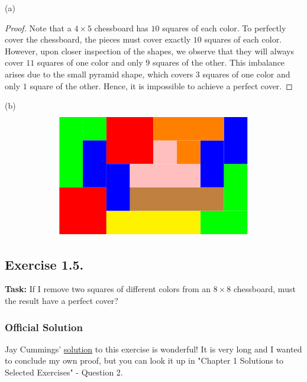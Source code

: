 \documentclass{article}
\begin{document}
(a) 
\begin{proof}
    Note that a $4 \times 5$ chessboard has $10$ squares of each color. To perfectly cover the chessboard, the pieces must cover exactly $10$ squares of each color. However, upon closer inspection of the shapes, we observe that they will always cover $11$ squares of one color and only $9$ squares of the other. This imbalance arises due to the small pyramid shape, which covers $3$ squares of one color and only $1$ square of the other. Hence, it is impossible to achieve a perfect cover.
    
\end{proof}

\noindent (b) 
\[
\begin{tikzpicture}

\fill[red] (0,0) rectangle (2,2);   
\fill[red] (2,3) rectangle (4,5);   

\fill[green] (0,2) rectangle (1,5);   
\fill[green] (1,4) rectangle (2,5);   

\fill[green] (6,0) rectangle (8,1);   
\fill[green] (7,1) rectangle (8,3);  

\fill[yellow] (2,0) rectangle (6,1);   
\fill[brown] (3,1) rectangle (7,2);   

\fill[blue] (1,2) rectangle (2,4);   
\fill[blue] (2,1) rectangle (3,3);   

\fill[blue] (6,2) rectangle (7,4);   
\fill[blue] (7,3) rectangle (8,5);   

\fill[pink] (3,2) rectangle (6,3);   
\fill[pink] (4,3) rectangle (5,4);  

\fill[orange] (4,4) rectangle (7,5);   
\fill[orange] (5,3) rectangle (6,4);  

\end{tikzpicture} \]

\newpage

\subsection{Exercise 1.5.}
\textbf{Task:} If I remove two squares of different colors from an $8 \times 8$ chessboard, must the result have a perfect cover?

\subsubsection*{Official Solution} 
Jay Cummings' \textcolor{blue}{\href{https://longformmath.com/proofs-hints-\%26-solutions}{solution}} to this exercise is wonderful! It is very long and I wanted to conclude my own proof, but you can look it up in "Chapter 1 Solutions to Selected Exercises" - Question 2.
\end{document}
